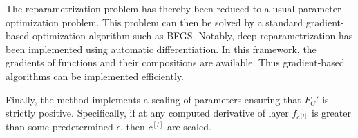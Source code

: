 The reparametrization problem has thereby been reduced to a usual parameter optimization problem. This problem can then be solved by a standard gradient-based optimization algorithm such as BFGS. Notably, deep reparametrization has been implemented using automatic differentiation. In this framework, the gradients of functions and their compositions are available. Thus gradient-based algorithms can be implemented efficiently.

Finally, the method implements a scaling of parameters ensuring that \(F_C' \) is strictly positive. Specifically, if at any computed derivative of layer  \(f_{c^{[l]}}\) is greater than some predetermined \(\epsilon\), then \(c^{[l]}\) are scaled. 